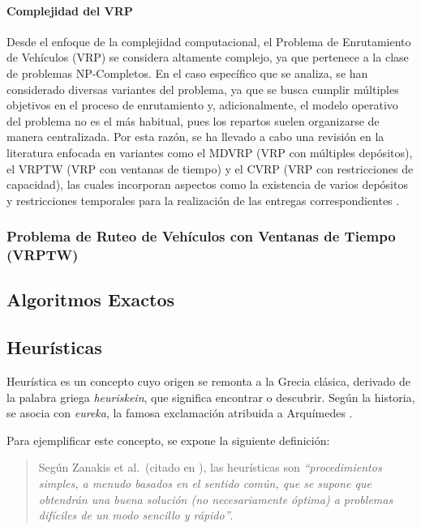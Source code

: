 \documentclass[12pt,titlepage,twoside,openright]{book}
\begin{document}
\paragraph{Complejidad del VRP}
Desde el enfoque de la complejidad computacional, el Problema de Enrutamiento de Vehículos (VRP) se considera altamente complejo, ya que pertenece a la clase de problemas NP-Completos. En el caso específico que se analiza, se han considerado diversas variantes del problema, ya que se busca cumplir múltiples objetivos en el proceso de enrutamiento y, adicionalmente, el modelo operativo del problema no es el más habitual, pues los repartos suelen organizarse de manera centralizada. Por esta razón, se ha llevado a cabo una revisión en la literatura enfocada en variantes como el MDVRP (VRP con múltiples depósitos), el VRPTW (VRP con ventanas de tiempo) y el CVRP (VRP con restricciones de capacidad), las cuales incorporan aspectos como la existencia de varios depósitos y restricciones temporales para la realización de las entregas correspondientes \cite{pino2011}.

\subsubsection{Problema de Ruteo de Vehículos con Ventanas de Tiempo (VRPTW)}




\subsection{Algoritmos Exactos}

\subsection{Heurísticas}

Heurística es un concepto cuyo origen se remonta a la Grecia clásica, derivado de la palabra griega \textit{heuriskein}, que significa encontrar o descubrir. Según la historia, se asocia con \textit{eureka}, la famosa exclamación atribuida a Arquímedes \citep{antonioSuarez2014}.

Para ejemplificar este concepto, se expone la siguiente definición:

\begin{quote}
	Según Zanakis et al.\ (citado en \citep{duarte2007metaheuristicas}), las heurísticas son \textit{``procedimientos simples, a menudo basados en el sentido común, que se supone que obtendrán una buena solución (no necesariamente óptima) a problemas difíciles de un modo sencillo y rápido''}.
\end{quote}
\end{document}
